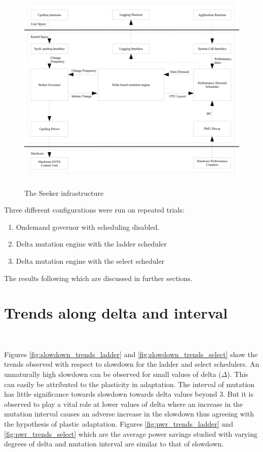 \begin{figure}[h!]
  \begin{center}
    \includegraphics[height=4in]{figures/seeker.jpg}%
    \caption{The Seeker infrastructure}
    \label{fig:entire_seeker}
  \end{center}
\end{figure}


Three different configurations were run on repeated trials: 
\begin{enumerate}
\item Ondemand governor with scheduling disabled. 
\item Delta mutation engine with the ladder scheduler
\item Delta mutation engine with the select scheduler
\end{enumerate}
The results following which are discussed in further sections. 

\section{Trends along delta and interval}~\label{sec:trends}

Figures \ref{fig:slowdown_trends_ladder} and \ref{fig:slowdown_trends_select} show the trends
observed with respect to slowdown for the ladder and select schedulers. An unnaturally 
high slowdown can be observed for small values of delta ($\Delta$). This can easily be attributed
to the plasticity in adaptation. The interval of mutation has little significance towards slowdown
towards delta values beyond 3. But it is observed to play a vital role at lower values of delta 
where an increase in the mutation interval causes an adverse increase in the slowdown thus 
agreeing with the hypothesis of plastic adaptation. Figures \ref{fig:pwr_trends_ladder} and
\ref{fig:pwr_trends_select} which are the average power savings studied with varying degrees
of delta and mutation interval are similar to that of slowdown. 

